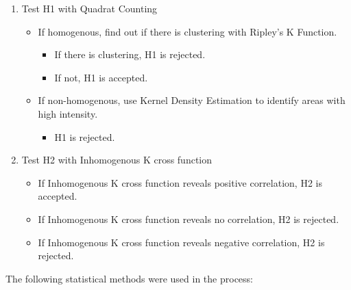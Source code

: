 \documentclass[]{article}
\providecommand{\tightlist}{%
  \setlength{\itemsep}{0pt}\setlength{\parskip}{0pt}}
\theoremstyle{definition}
\theoremstyle{definition}
\theoremstyle{definition}
\theoremstyle{remark}
\begin{document}
\begin{enumerate}
\def\labelenumi{\arabic{enumi}.}
\tightlist
\item
  Test H1 with Quadrat Counting

  \begin{itemize}
  \tightlist
  \item
    If homogenous, find out if there is clustering with Ripley's K
    Function.

    \begin{itemize}
    \tightlist
    \item
      If there is clustering, H1 is rejected.
    \item
      If not, H1 is accepted.
    \end{itemize}
  \item
    If non-homogenous, use Kernel Density Estimation to identify areas
    with high intensity.

    \begin{itemize}
    \tightlist
    \item
      H1 is rejected.
    \end{itemize}
  \end{itemize}
\item
  Test H2 with Inhomogenous K cross function

  \begin{itemize}
  \tightlist
  \item
    If Inhomogenous K cross function reveals positive correlation, H2 is
    accepted.
  \item
    If Inhomogenous K cross function reveals no correlation, H2 is
    rejected.
  \item
    If Inhomogenous K cross function reveals negative correlation, H2 is
    rejected.
  \end{itemize}
\end{enumerate}

The following statistical methods were used in the process:
\end{document}
